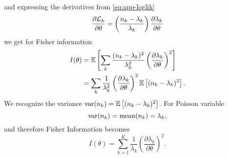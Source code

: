 and expressing the derivatives from \autoref{eq:app-loglik}
%
\begin{equation}
	\frac{\partial \mathcal{L}_k}{\partial\theta}=\left(\frac{n_k-\lambda_k}{\lambda_k} \right)\frac{\partial\lambda_k}{\partial\theta}
\end{equation}
%
we get for Fisher information
%
\begin{alignat}{2}
	I(\theta)
	&=\mathbb{E}\left[\sum_k\frac{(n_k-\lambda_k)^2}{\lambda_k^2}\left(\frac{\partial\lambda_k}{\partial\theta}\right)^2\right]\\
	&=\sum_k\frac{1}{\lambda_k^2}\left(\frac{\partial\lambda_k}{\partial\theta}\right)^2\mathbb{E}\left[(n_k-\lambda_k)^2\right].
\end{alignat}
%
We recognize the variance $\mathrm{var}(n_k)=\mathbb{E}\left[(n_k-\lambda_k)^2\right]$. For Poisson variable 
%
\begin{equation}
	\mathrm{var}(n_k)=\mathrm{mean}(n_k)=\lambda_k,
\end{equation}
%
and therefore Fisher Information becomes
%
\begin{equation}
	I(\theta)=\sum_{k=1}^K\frac{1}{\lambda_k}\left(\frac{\partial \lambda_k}{\partial \theta}\right)^2.
	\label{eq:app-Fisher Info for Poisson}
\end{equation}


%


